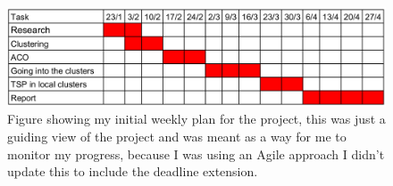 \begin{figure}
    \centering
    \includegraphics[width=\textwidth]{figures/initial_weekly_plan.png}
    \caption{Figure showing my initial weekly plan for the project, this was just a guiding view of the project and was meant as a way for me to monitor my progress, because I was using an Agile approach I didn't update this to include the deadline extension.}
    \label{fig:initial_weekly_plan}
\end{figure}